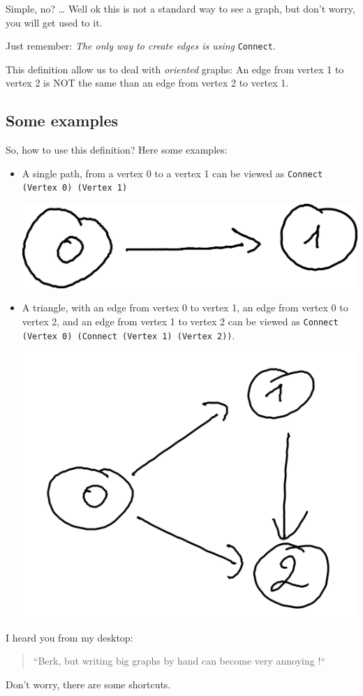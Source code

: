 \documentclass[10pt,a4paper]{article}
\begin{document}
Simple, no?
\ldots
Well ok this is not a standard way to see a graph, but don't worry, you will get used to it.

Just remember: \emph{The only way to create edges is using} \verb|Connect|.

This definition allow us to deal with \emph{oriented} graphs: An edge from vertex 1 to vertex 2 is NOT the same than an edge from vertex 2 to vertex 1.

\subsection{Some examples}

So, how to use this definition? Here some examples:

\begin{itemize}
	\item A single path, from a vertex 0 to a vertex 1 can be viewed as \verb|Connect (Vertex 0) (Vertex 1)|
	\begin{center}
	\includegraphics[scale=0.5]{figspng/e2.png}
	\end{center}
	\item A triangle, with an edge from vertex 0 to vertex 1, an edge from vertex 0 to vertex 2, and an edge from vertex 1 to vertex 2 can be viewed as \verb|Connect (Vertex 0) (Connect (Vertex 1) (Vertex 2))|.
	\begin{center}
	\includegraphics[scale=0.5]{figspng/e1.png}
	\end{center}

\end{itemize}
I heard you from my desktop:
\begin{quote}
	``Berk, but writing big graphs by hand can become very annoying !``
\end{quote}
Don't worry, there are some shortcuts.
\end{document}
